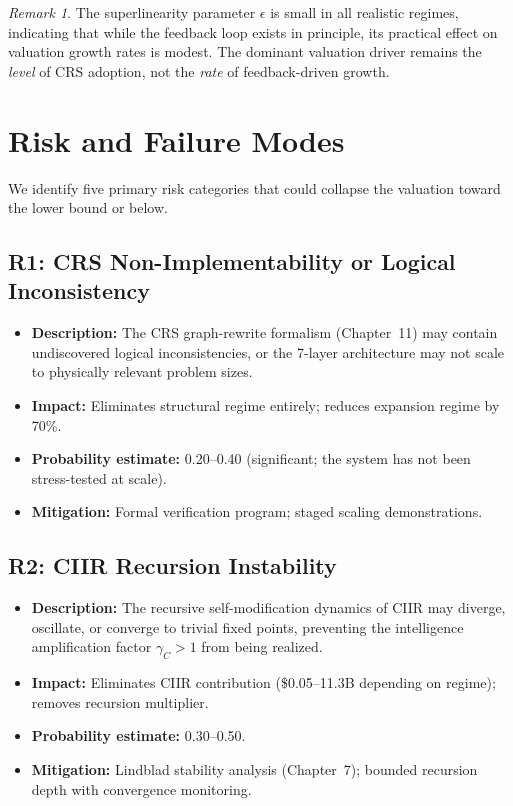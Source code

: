 \documentclass[11pt,a4paper]{article}
\theoremstyle{remark}
\newtheorem{remark}[definition]{Remark}
\newcommand{\interpretive}[1]{\textcolor{blue!70!black}{#1}}
\begin{document}
\begin{remark}
\interpretive{The superlinearity parameter $\epsilon$ is small in
all realistic regimes, indicating that while the feedback loop exists
in principle, its practical effect on valuation growth rates is
modest.  The dominant valuation driver remains the \emph{level} of
CRS adoption, not the \emph{rate} of feedback-driven growth.}
\end{remark}


\section{Risk and Failure Modes}
\label{sec:risk}

We identify five primary risk categories that could collapse
the valuation toward the lower bound or below.

\subsection{R1: CRS Non-Implementability or Logical Inconsistency}

\begin{itemize}[nosep]
  \item \textbf{Description:} The CRS graph-rewrite formalism
        (Chapter~11) may contain undiscovered logical
        inconsistencies, or the 7-layer architecture may not scale
        to physically relevant problem sizes.
  \item \textbf{Impact:} Eliminates structural regime entirely;
        reduces expansion regime by 70\%.
  \item \textbf{Probability estimate:} 0.20--0.40 (significant;
        the system has not been stress-tested at scale).
  \item \textbf{Mitigation:} Formal verification program; staged
        scaling demonstrations.
\end{itemize}

\subsection{R2: CIIR Recursion Instability}

\begin{itemize}[nosep]
  \item \textbf{Description:} The recursive self-modification
        dynamics of CIIR may diverge, oscillate, or converge to
        trivial fixed points, preventing the intelligence
        amplification factor $\gamma_C > 1$ from being realized.
  \item \textbf{Impact:} Eliminates CIIR contribution
        (\$0.05--11.3B depending on regime); removes recursion
        multiplier.
  \item \textbf{Probability estimate:} 0.30--0.50.
  \item \textbf{Mitigation:} Lindblad stability analysis
        (Chapter~7); bounded recursion depth with convergence
        monitoring.
\end{itemize}
\end{document}

